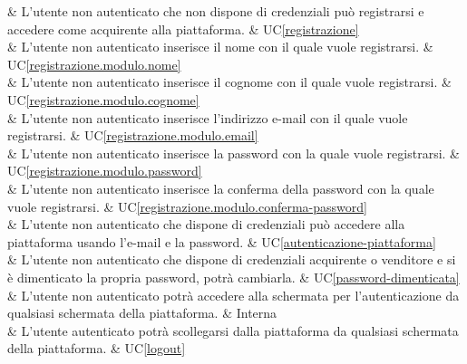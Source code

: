  & L'utente non autenticato che non dispone di credenziali può registrarsi e accedere come acquirente alla piattaforma. & UC\ref{registrazione} \\

 & L'utente non autenticato inserisce il nome con il quale vuole registrarsi. & UC\ref{registrazione.modulo.nome} \\

 & L'utente non autenticato inserisce il cognome con il quale vuole registrarsi. & UC\ref{registrazione.modulo.cognome} \\

 & L'utente non autenticato inserisce l'indirizzo e-mail con il quale vuole registrarsi. & UC\ref{registrazione.modulo.email} \\

 & L'utente non autenticato inserisce la password con la quale vuole registrarsi. & UC\ref{registrazione.modulo.password} \\

  & L'utente non autenticato inserisce la conferma della password con la quale vuole registrarsi. & UC\ref{registrazione.modulo.conferma-password} \\

 & L'utente non autenticato che dispone di credenziali può accedere alla piattaforma usando l'e-mail e la password. & UC\ref{autenticazione-piattaforma} \\

 & L'utente non autenticato che dispone di credenziali acquirente o venditore e si è dimenticato la propria password, potrà cambiarla. & UC\ref{password-dimenticata} \\

 & L'utente non autenticato potrà accedere alla schermata per l'autenticazione da qualsiasi schermata della piattaforma. & Interna \\

 & L'utente autenticato potrà scollegarsi dalla piattaforma da qualsiasi schermata della piattaforma. & UC\ref{logout} \\

